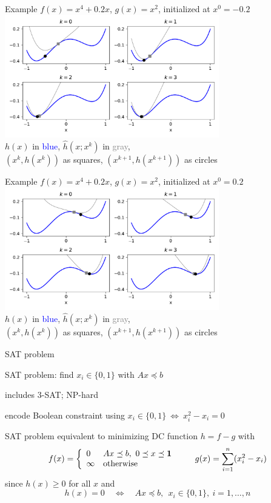 \documentclass[aspectratio=169,11pt]{beamer}
\begin{document}
\begin{frame}{Example}
\centering
$f(x) = x^4 + 0.2 x$, $g(x) = x^2$, initialized at $x^0 = -0.2$ \\
\includegraphics[width=0.7\textwidth]{DC1_iterations_left.pdf} \\
$h(x)$ in \textcolor{blue}{blue},
$\hat h(x;x^k)$ in \textcolor{gray}{gray}, \\
$(x^k, h(x^k))$ as squares,
$(x^{k+1}, h(x^{k+1}))$ as circles
\end{frame}

\begin{frame}{Example}
\centering
$f(x) = x^4 + 0.2 x$, $g(x) = x^2$, initialized at $x^0 = 0.2$ \\
\includegraphics[width=0.7\textwidth]{DC1_iterations_right.pdf} \\
$h(x)$ in \textcolor{blue}{blue},
$\hat h(x;x^k)$ in \textcolor{gray}{gray}, \\
$(x^k, h(x^k))$ as squares,
$(x^{k+1}, h(x^{k+1}))$ as circles
\end{frame}

\begin{frame}{SAT problem}
\BIT
\item SAT problem: find $x_i \in \{0,1\}$ with $Ax \preceq b$
\item includes 3-SAT; NP-hard
\item encode Boolean constraint using $x_i \in \{0,1\} ~\Longleftrightarrow~
x_i^2-x_i = 0$
\item SAT problem equivalent to minimizing DC function $h=f-g$ with
\[
f(x) = \left\{ \begin{array}{ll} 0 & Ax \preceq b,~0 \preceq x \preceq \mathbf 1\\
\infty & \mbox{otherwise}
\end{array}\right. \qquad 
g(x) = \sum_{i=1}^n (x_i^2-x_i)
\]
since $h(x) \geq 0$ for all $x$ and
\[
h(x) = 0 \quad \Longleftrightarrow \quad Ax \preceq b,~~x_i \in \{0,1\},
~i=1, \ldots, n
\]
\EIT
\end{frame}
\end{document}
